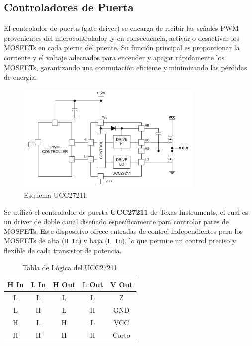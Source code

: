 \documentclass[11pt]{report}
\begin{document}
\newpage
\subsection{Controladores de Puerta}

El controlador de puerta (gate driver) se encarga de recibir las señales PWM provenientes del microcontrolador ,y en consecuencia, activar o desactivar los MOSFETs en cada pierna del puente. Su función principal es proporcionar la corriente y el voltaje adecuados para encender y apagar rápidamente los MOSFETs, garantizando una conmutación eficiente y minimizando las pérdidas de energía.

\begin{figure}[ht]
	\centering
	\includegraphics[width=0.8\textwidth]{imagenes/Diagramas/UCC27211.png}
	\caption{Esquema UCC27211.}
	\label{UCC27211}
\end{figure}
\FloatBarrier

Se utilizó el controlador de puerta \textbf{UCC27211} de Texas Instruments, el cual es un driver de doble canal diseñado específicamente para controlar pares de MOSFETs. Este dispositivo ofrece entradas de control independientes para los MOSFETs de alta (\texttt{H In}) y baja (\texttt{L In}), lo que permite un control preciso y flexible de cada transistor de potencia.

\begin{table}[ht]
	\centering
	\caption{Tabla de Lógica del UCC27211}
	\label{tab:device_logic}
	\begin{tabular}{|c|c|c|c|c|}
		\hline
		\textbf{H In} & \textbf{L In} & \textbf{H Out} & \textbf{L Out} & \textbf{V Out} \\ \hline
		L             & L             & L              & L              & Z              \\ \hline
		L             & H             & L              & H              & GND            \\ \hline
		H             & L             & H              & L              & VCC            \\ \hline
		H             & H             & H              & H              & Corto          \\ \hline
	\end{tabular}
\end{table}
\FloatBarrier
\end{document}
